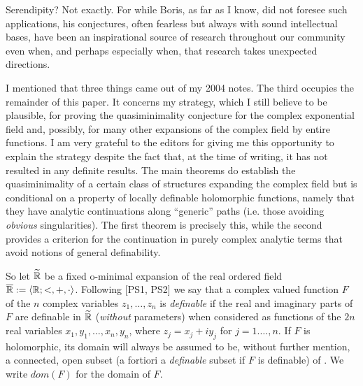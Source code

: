 \documentclass[12pt,nodate]{article}
\begin{document}
Serendipity? Not exactly. For while Boris, as far as I know, did not foresee such applications, his conjectures, often fearless but always with sound intellectual bases, have been an inspirational source of  research throughout our community even when, and perhaps especially when, that research takes unexpected directions.

\vspace{3mm}

I mentioned that three things came out of my 2004 notes. The third occupies the remainder of this paper. It concerns my strategy, which I still believe to be plausible, for proving the quasiminimality conjecture for the complex exponential field and, possibly, for many other expansions of the complex field by entire functions. I am very grateful to the editors for giving me this opportunity to explain the strategy despite the fact that, at the time of writing, it has not resulted in any definite results. The main theorems do establish the quasiminimality of a certain class of structures expanding the complex field but is conditional on a property of locally definable holomorphic functions, namely that they have analytic continuations along ``generic'' paths (i.e. those avoiding \emph{obvious} singularities). The first theorem is precisely this, while the second provides a  criterion for the continuation in purely complex analytic terms that avoid notions of general definability.


\vspace{7mm}

So let $\widetilde{\mathbb{R}}$ be a fixed o-minimal expansion of the real ordered field \\ $\overline{\mathbb{R}} := \langle \mathbb{R} ; < , + , \cdot \rangle$. Following [PS1, PS2] we say that a complex valued function $F$ of the $n$ complex variables $z_1, \ldots, z_n$ is \emph{definable} if the real and imaginary parts of $F$ are definable in 
$\widetilde{\mathbb{R}}$ (\emph{without} parameters) when considered as functions of the $2n$ real variables $x_1,y_1,\ldots,x_n,y_n$, where $z_j=x_j+ i y_j$ for $j=1.\ldots,n$. If $F$ is holomorphic, its domain will always be assumed to be, without further mention, a connected, open subset (a fortiori a \emph{definable} subset if $F$ is definable) of \Cn . We write $dom(F)$ for the domain of $F$.

\vspace{3mm}
\end{document}
